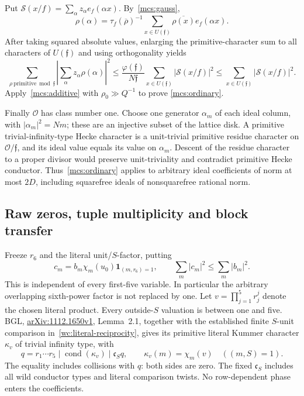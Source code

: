 Put $\mathcal S(x/f)=\sum_\alpha z_\alpha e_f(\alpha x)$.
By~\eqref{mcs:gauss},
\[
 \rho(\alpha)=\tau_f(\overline\rho)^{-1}
       \sum_{x\in U(\mathfrak f)}\overline{\rho(x)}e_f(\alpha x).
\]
After taking squared absolute values, enlarging the primitive-character
sum to all characters of $U(\mathfrak f)$ and using orthogonality yields
\[
 \sum_{\rho\ \mathrm{primitive}\bmod\mathfrak f}
       \left|\sum_\alpha z_\alpha\rho(\alpha)\right|^2
 \le\frac{\varphi(\mathfrak f)}{N\mathfrak f}
       \sum_{x\in U(\mathfrak f)}|\mathcal S(x/f)|^2
 \le\sum_{x\in U(\mathfrak f)}|\mathcal S(x/f)|^2.
\]
Apply~\eqref{mcs:additive} with $\rho_0\gg Q^{-1}$ to prove
\eqref{mcs:ordinary}.

Finally $\mathcal O$ has class number one. Choose one generator
$\alpha_m$ of each ideal column, with $|\alpha_m|^2=Nm$; these are an
injective subset of the lattice disk. A primitive trivial-infinity-type
Hecke character is a unit-trivial primitive residue character on
$\mathcal O/\mathfrak f$, and its ideal value equals its value on
$\alpha_m$. Descent of the residue character to a proper divisor would
preserve unit-triviality and contradict primitive Hecke conductor.
Thus~\eqref{mcs:ordinary} applies to arbitrary ideal coefficients of
norm at most $2D$, including squarefree ideals of nonsquarefree rational norm.

\subsection{Raw zeros, tuple multiplicity and block transfer}
Freeze $r_6$ and the literal unit/$S$-factor, putting
\[
 c_m=b_m\chi_m(u_0)\mathbf1_{(m,r_6)=1},\qquad
       \sum_m|c_m|^2\le\sum_m|b_m|^2.
\]
This is independent of every first-five variable. In particular the
arbitrary overlapping sixth-power factor is not replaced by one.
Let $v=\prod_{j=1}^5r_j^j$ denote the chosen literal product.
Every outside-$S$ valuation is between one and five.
BGL, \href{https://arxiv.org/pdf/1112.1650v1}{arXiv:1112.1650v1},
Lemma~2.1, together with the established finite $S$-unit comparison
in~\eqref{wc:literal-reciprocity}, gives its primitive literal Kummer
character $\kappa_v$ of trivial infinity type, with
\[
 q=r_1\cdots r_5\mid\operatorname{cond}(\kappa_v)\mid\mathfrak c_Sq,
 \qquad \kappa_v(m)=\chi_m(v)\quad((m,S)=1).
\]
The equality includes collisions with $q$: both sides are zero.
The fixed $\mathfrak c_S$ includes all wild conductor types and literal
comparison twists. No row-dependent phase enters the coefficients.

